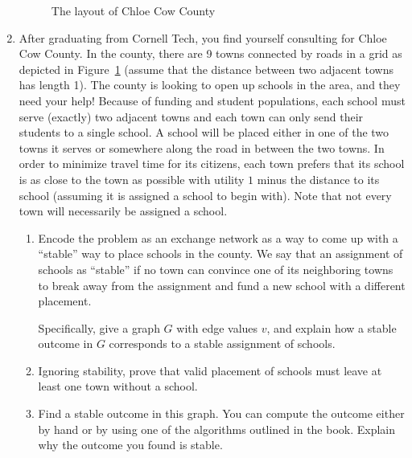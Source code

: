 \documentclass[11pt,letterpaper]{article}
\theoremstyle{definition}
\begin{document}
\begin{enumerate}
\begin{figure}[t!]
\begin{center}
\end{center}
\caption{The layout of Chloe Cow County}
\label{fig:county}
\end{figure}


\item After graduating from Cornell Tech, you find yourself consulting for Chloe Cow County.
In the county, there are 9 towns connected by roads in a grid as depicted in Figure~\ref{fig:county} (assume that the distance between two adjacent towns has length 1).
The county is looking to open up schools in the area, and they need your help!
Because of funding and student populations, each school must serve (exactly) two adjacent towns and each town can only send their students to a single school.
A school will be placed either in one of the two towns it serves or somewhere along the road in between the two towns.
In order to minimize travel time for its citizens, each town prefers that its school is as close to the town as possible with utility $1$ minus the distance to its school (assuming it is assigned a school to begin with). 
Note that not every town will necessarily be assigned a school.

\begin{enumerate}
\item Encode the problem as an exchange network as a way to come up with a ``stable'' way to place schools in the county.
We say that an assignment of schools as ``stable'' if no town can convince one of its neighboring towns to break away from the assignment and fund a new school with a different placement. 

Specifically, give a graph $G$ with edge values $v$, and explain how a stable outcome in $G$ corresponds to a stable assignment of schools.

\item Ignoring stability, prove that valid placement of schools must leave at least one town without a school.

\item Find a stable outcome in this graph.
You can compute the outcome either by hand or by using one of the algorithms outlined in the book.
Explain why the outcome you found is stable.


\end{enumerate}
\end{enumerate}
\end{document}
